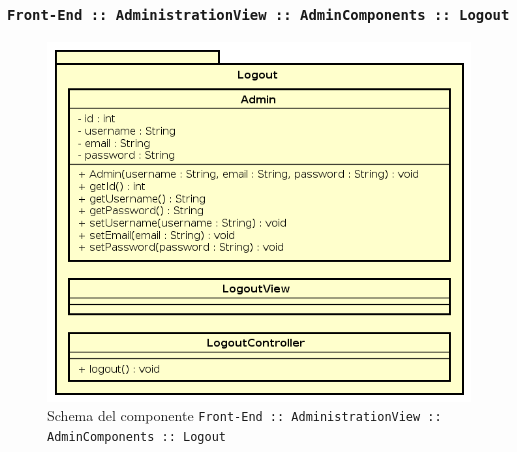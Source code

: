 \documentclass[../DefinizioneDiProdotto.tex]{subfiles}
\begin{document}
	\subsubsection{ \texttt{Front-End :: AdministrationView :: AdminComponents :: Logout}}
		\begin{figure}[!h]
			\centering
			\includegraphics[scale=0.7]{Architettura/Front-End/Administration/AdminComponents/Logout.png}
			\caption{Schema del componente \texttt{Front-End :: AdministrationView :: AdminComponents :: Logout}}
		\end{figure}
\end{document}
